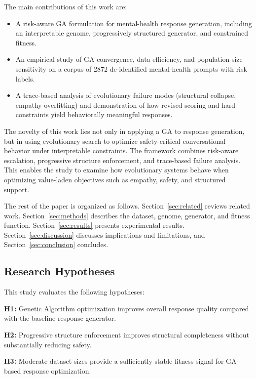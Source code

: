 \documentclass[mathematics,article,xetex,moreauthors]{Definitions/mdpi}
\begin{document}
The main contributions of this work are:
\begin{itemize}
  \item A risk-aware GA formulation for mental-health response generation,
        including an interpretable genome, progressively structured generator,
        and constrained fitness.
  \item An empirical study of GA convergence, data efficiency, and
        population-size sensitivity on a corpus of 2872 de-identified
        mental-health prompts with risk labels.
  \item A trace-based analysis of evolutionary failure modes (structural
        collapse, empathy overfitting) and demonstration of how revised scoring
        and hard constraints yield behaviorally meaningful responses.
\end{itemize}

The novelty of this work lies not only in applying a GA to response generation,
but in using evolutionary search to optimize safety-critical conversational
behavior under interpretable constraints. The framework combines risk-aware
escalation, progressive structure enforcement, and trace-based failure analysis.
This enables the study to examine how evolutionary systems behave when
optimizing value-laden objectives such as empathy, safety, and structured
support.

The rest of the paper is organized as follows.
Section~\ref{sec:related} reviews related work.
Section~\ref{sec:methods} describes the dataset, genome, generator, and fitness
function.
Section~\ref{sec:results} presents experimental results.
Section~\ref{sec:discussion} discusses implications and limitations, and
Section~\ref{sec:conclusion} concludes.

\subsection{Research Hypotheses}

This study evaluates the following hypotheses:

\textbf{H1:} Genetic Algorithm optimization improves overall response quality
compared with the baseline response generator.

\textbf{H2:} Progressive structure enforcement improves structural completeness
without substantially reducing safety.

\textbf{H3:} Moderate dataset sizes provide a sufficiently stable fitness
signal for GA-based response optimization.
\end{document}
